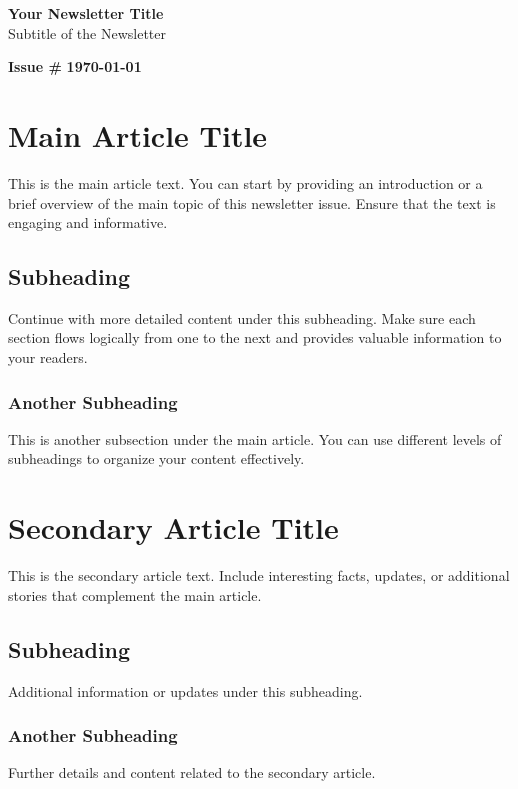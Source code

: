 \documentclass{article}
\begin{document}
\begin{center}
    {\LARGE \textbf{Your Newsletter Title}} \\
    {\large Subtitle of the Newsletter}
\end{center}

\vspace{1cm}

\begin{flushright}
    \textbf{Issue \#}
    \textbf{\today}
\end{flushright}

\vspace{1cm}

\section*{Main Article Title}

This is the main article text. You can start by providing an introduction or a brief overview of the main topic of this newsletter issue. Ensure that the text is engaging and informative.

\subsection*{Subheading}
Continue with more detailed content under this subheading. Make sure each section flows logically from one to the next and provides valuable information to your readers.

\subsubsection*{Another Subheading}
This is another subsection under the main article. You can use different levels of subheadings to organize your content effectively.

\section*{Secondary Article Title}

This is the secondary article text. Include interesting facts, updates, or additional stories that complement the main article.

\subsection*{Subheading}
Additional information or updates under this subheading.

\subsubsection*{Another Subheading}
Further details and content related to the secondary article.
\end{document}
